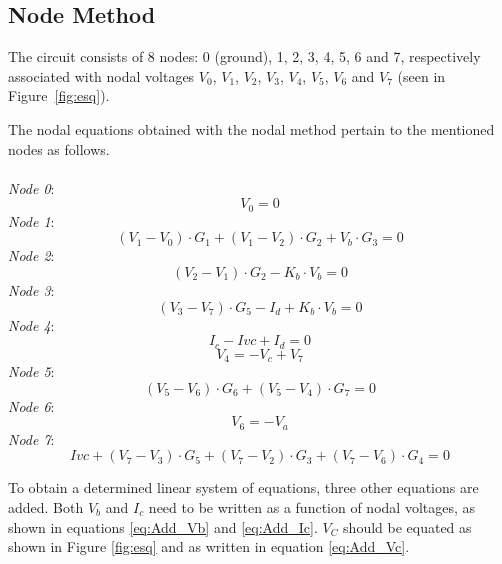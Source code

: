 \subsection{Node Method}
\label{subsec:node}


The circuit consists of 8 nodes: 0 (ground), 1, 2, 3, 4, 5, 6 and 7, respectively associated with nodal voltages $V_0$, $V_1$, $V_2$, $V_3$, $V_4$, $V_5$, $V_6$ and $V_7$ (seen in Figure~\ref{fig:esq}). 

The nodal equations obtained with the nodal method pertain to the mentioned nodes as follows.
\\
\\
\textit{Node 0}:
\begin{equation}
  V_0=0
  \label{eq:N_0}
\end{equation}
\textit{Node 1}:
\begin{equation}
    (V_1 - V_0) \cdot G_1 + (V_1 - V_2) \cdot G_2 + V_b \cdot G_3 = 0
    \label{eq:N_1}
\end{equation}
\textit{Node 2}:
\begin{equation}
    (V_2 - V_1) \cdot G_2 - K_b \cdot V_b = 0
    \label{eq:N_2}
\end{equation}
\textit{Node 3}:
\begin{equation}
    (V_3 - V_7) \cdot G_5 - I_d + K_b \cdot V_b = 0
    \label{eq:N_3}
\end{equation}
\textit{Node 4}:
\begin{equation}
    I_c - Ivc + I_d = 0
    \label{eq:N_4_1}
\end{equation}
\begin{equation}
    V_4 = - V_c + V_7
    \label{eq:N_4_2}
\end{equation}
\textit{Node 5}:
\begin{equation}
  (V_5 - V_6) \cdot G_6 + (V_5 - V_4) \cdot G_7 = 0
  \label{eq:N_5}
\end{equation}
\textit{Node 6}:
\begin{equation}
    V_6 = - V_a
  \label{eq:N_6}
\end{equation}
\textit{Node 7}:
\begin{equation}
  Ivc + (V_7 - V_3) \cdot G_5 + (V_7 - V_2) \cdot G_3 + (V_7 - V_6) \cdot G_4 = 0
  \label{eq:N_7}
\end{equation}

To obtain a determined linear system of equations, three other equations are added. Both $V_b$ and $I_c$ need to be written as a function of nodal voltages, as shown in equations \ref{eq:Add_Vb} and \ref{eq:Add_Ic}. $V_C$ should be equated as shown in Figure \ref{fig:esq} and as written in equation \ref{eq:Add_Vc}.

